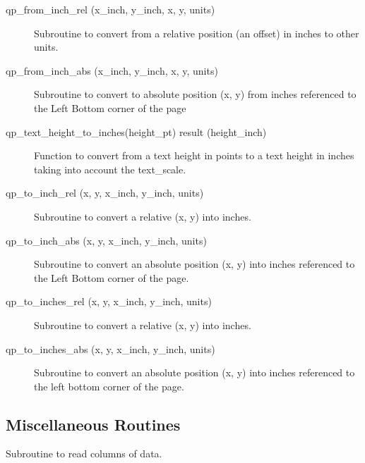 \begin{description}

\item[qp_from_inch_rel (x_inch, y_inch, x, y, units)] \Newline 
     Subroutine to convert from a relative position (an offset) in inches
     to other units.

\item[qp_from_inch_abs (x_inch, y_inch, x, y, units)] \Newline 
     Subroutine to convert to absolute position (x, y) from inches referenced
     to the Left Bottom corner of the page

\item[qp_text_height_to_inches(height_pt) result (height_inch)] \Newline 
Function to convert from a text height in points to a text height in
inches taking into account the text_scale.

\item[qp_to_inch_rel (x, y, x_inch, y_inch, units)] \Newline 
Subroutine to convert a relative (x, y) into inches.

\item[qp_to_inch_abs (x, y, x_inch, y_inch, units)] \Newline 
Subroutine to convert an absolute position (x, y) into inches referenced
to the Left Bottom corner of the page.

\item[qp_to_inches_rel (x, y, x_inch, y_inch, units)] \Newline 
     Subroutine to convert a relative (x, y) into inches.

\item[qp_to_inches_abs (x, y, x_inch, y_inch, units)] \Newline 
     Subroutine to convert an absolute position (x, y) into inches referenced
     to the left bottom corner of the page.

\end{description}

\subsection{Miscellaneous Routines}

\begin{description}

\item[qp_read_data (iu, err_flag, x, ix_col, y, iy_col, z, iz_col, 
                                                               t, it_col) ] \Newline 
     Subroutine to read columns of data.

\end{description}

